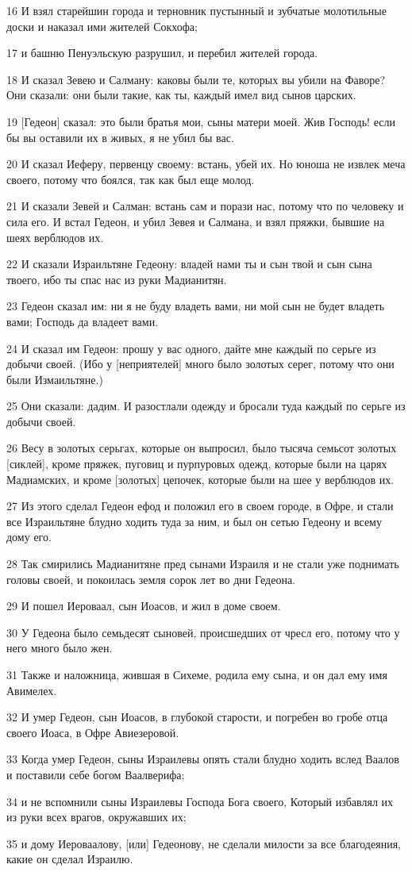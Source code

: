 \par 16 И взял старейшин города и терновник пустынный и зубчатые молотильные доски и наказал ими жителей Сокхофа;
\par 17 и башню Пенуэльскую разрушил, и перебил жителей города.
\par 18 И сказал Зевею и Салману: каковы были те, которых вы убили на Фаворе? Они сказали: они были такие, как ты, каждый имел вид сынов царских.
\par 19 [Гедеон] сказал: это были братья мои, сыны матери моей. Жив Господь! если бы вы оставили их в живых, я не убил бы вас.
\par 20 И сказал Иеферу, первенцу своему: встань, убей их. Но юноша не извлек меча своего, потому что боялся, так как был еще молод.
\par 21 И сказали Зевей и Салман: встань сам и порази нас, потому что по человеку и сила его. И встал Гедеон, и убил Зевея и Салмана, и взял пряжки, бывшие на шеях верблюдов их.
\par 22 И сказали Израильтяне Гедеону: владей нами ты и сын твой и сын сына твоего, ибо ты спас нас из руки Мадианитян.
\par 23 Гедеон сказал им: ни я не буду владеть вами, ни мой сын не будет владеть вами; Господь да владеет вами.
\par 24 И сказал им Гедеон: прошу у вас одного, дайте мне каждый по серьге из добычи своей. (Ибо у [неприятелей] много было золотых серег, потому что они были Измаильтяне.)
\par 25 Они сказали: дадим. И разостлали одежду и бросали туда каждый по серьге из добычи своей.
\par 26 Весу в золотых серьгах, которые он выпросил, было тысяча семьсот золотых [сиклей], кроме пряжек, пуговиц и пурпуровых одежд, которые были на царях Мадиамских, и кроме [золотых] цепочек, которые были на шее у верблюдов их.
\par 27 Из этого сделал Гедеон ефод и положил его в своем городе, в Офре, и стали все Израильтяне блудно ходить туда за ним, и был он сетью Гедеону и всему дому его.
\par 28 Так смирились Мадианитяне пред сынами Израиля и не стали уже поднимать головы своей, и покоилась земля сорок лет во дни Гедеона.
\par 29 И пошел Иероваал, сын Иоасов, и жил в доме своем.
\par 30 У Гедеона было семьдесят сыновей, происшедших от чресл его, потому что у него много было жен.
\par 31 Также и наложница, жившая в Сихеме, родила ему сына, и он дал ему имя Авимелех.
\par 32 И умер Гедеон, сын Иоасов, в глубокой старости, и погребен во гробе отца своего Иоаса, в Офре Авиезеровой.
\par 33 Когда умер Гедеон, сыны Израилевы опять стали блудно ходить вслед Ваалов и поставили себе богом Ваалверифа;
\par 34 и не вспомнили сыны Израилевы Господа Бога своего, Который избавлял их из руки всех врагов, окружавших их;
\par 35 и дому Иероваалову, [или] Гедеонову, не сделали милости за все благодеяния, какие он сделал Израилю.

